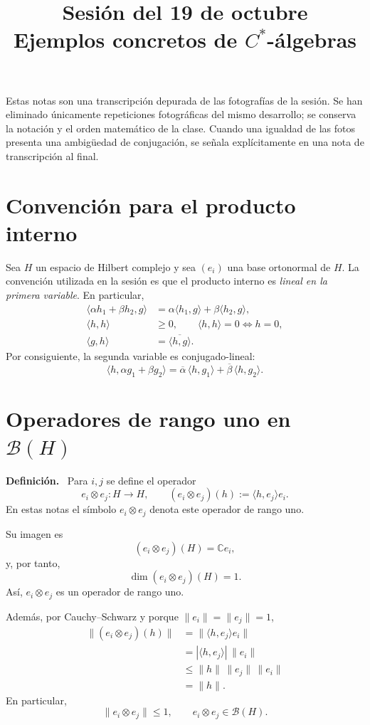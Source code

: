 \documentclass[11pt]{article}
\title{Sesión del 19 de octubre\\Ejemplos concretos de $C^*$-álgebras}
\author{}
\date{}
\newcommand{\C}{\mathbb{C}}
\newcommand{\BH}{\mathcal{B}(H)}
\newenvironment{definicion}{\par\medskip\noindent\textbf{Definición.}\ }{\par\medskip}
\begin{document}
\maketitle

\noindent
Estas notas son una transcripción depurada de las fotografías de la sesión. Se han
eliminado únicamente repeticiones fotográficas del mismo desarrollo; se conserva
la notación y el orden matemático de la clase. Cuando una igualdad de las fotos
presenta una ambigüedad de conjugación, se señala explícitamente en una nota de
transcripción al final.

\section{Convención para el producto interno}

Sea $H$ un espacio de Hilbert complejo y sea $(e_i)$ una base ortonormal de $H$.
La convención utilizada en la sesión es que el producto interno es \emph{lineal en
la primera variable}. En particular,
\begin{align*}
\langle \alpha h_1+\beta h_2,g\rangle
 &=\alpha\langle h_1,g\rangle+\beta\langle h_2,g\rangle,\\
\langle h,h\rangle&\ge 0,
\qquad
\langle h,h\rangle=0\iff h=0,\\
\langle g,h\rangle&=\overline{\langle h,g\rangle}.
\end{align*}
Por consiguiente, la segunda variable es conjugado-lineal:
\[
\langle h,\alpha g_1+\beta g_2\rangle
=
\overline{\alpha}\,\langle h,g_1\rangle
+
\overline{\beta}\,\langle h,g_2\rangle.
\]

\section{Operadores de rango uno en $\mathcal{B}(H)$}

\begin{definicion}
Para $i,j$ se define el operador
\[
 e_i\otimes e_j:H\longrightarrow H,
 \qquad
 (e_i\otimes e_j)(h):=\langle h,e_j\rangle e_i.
\]
En estas notas el símbolo $e_i\otimes e_j$ denota este operador de rango uno.
\end{definicion}

Su imagen es
\[
(e_i\otimes e_j)(H)=\C e_i,
\]
y, por tanto,
\[
\dim (e_i\otimes e_j)(H)=1.
\]
Así, $e_i\otimes e_j$ es un operador de rango uno.

Además, por Cauchy--Schwarz y porque $\|e_i\|=\|e_j\|=1$,
\begin{align*}
\|(e_i\otimes e_j)(h)\|
 &=\|\langle h,e_j\rangle e_i\|\\
 &=|\langle h,e_j\rangle|\,\|e_i\|\\
 &\le \|h\|\,\|e_j\|\,\|e_i\|\\
 &=\|h\|.
\end{align*}
En particular,
\[
\|e_i\otimes e_j\|\le 1,
\qquad
 e_i\otimes e_j\in\BH.
\]
\end{document}
